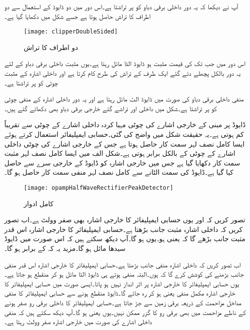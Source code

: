 آپ نے دیکھا کہ یہ دور داخلی برقی دباو کو  پر تراشتا ہے۔اس دور میں دو ڈایوڈ کے استعمال سے دو اطراف کا تراش حاصل ہوتا ہے جسے شکل   میں دکھایا گیا ہے۔
\begin{figure}
\centering
\texttt{[image: clipperDoubleSided]}
\caption{دو اطراف کا تراش}
\label{شکل_دو_اطراف_کا_تراش}
\end{figure}
اس دور میں جب تک  کی قیمت مثبت ہو ڈایوڈ  الٹا مائل رہتا ہے۔یوں مثبت داخلی برقی دباو کے لئے یہ دور بالکل پچھلے دئے گئے ایک طرف کے تراش کی طرح کام کرتا ہے اور داخلی اشارہ کے مثبت چوٹی کو  پر تراشتا ہے۔

منفی داخلی برقی دباو کی صورت میں ڈایوڈ  الٹ مائل رہتا ہے اور یہ دور داخلی اشارہ کے منفی چوٹی کو  پر تراشتا ہے۔شکل میں داخلی اور تراشے گئے خارجی برقی دباو بھی دکھائے گئے ہیں۔

ڈایوڈ پر مبنی  کے خارجی اشارے کی چوٹی مہیا کردہ داخلی اشارے کے چوٹی سے تقریباً  کم ہوتی ہے۔یہ حقیقت شکل  میں واضح کی گئی۔حسابی ایمپلیفائر استعمال کرتے ہوئے ایسا کامل نصف لہر سمت کار حاصل ہوتا ہے  جس کے خارجی اشارے کی چوٹی داخلی اشارے کے چوٹی کے بالکل برابر ہوتی ہے۔شکل الف میں ایسا کامل نصف لہر مثبت سمت کار دکھایا گیا ہے جس میں خارجی اشارہ  کو ڈایوڈ کے خارجی سرے سے حاصل کیا گیا ہے۔ڈایوڈ کی سمت الٹانے سے  کامل نصف لہر منفی سمت کار حاصل ہو گا۔
\begin{figure}
\centering
\texttt{[image: opampHalfWaveRectifierPeakDetector]}
\caption{کامل ادوار}
\label{شکل_کامل_نصف_لہر_سمت_کار}
\end{figure}

تصور کریں کہ  اور یوں حسابی ایمپلیفائر کا خارجی اشارہ  بھی صفر وولٹ ہے۔اب تصور کریں کہ داخلی اشارہ مثبت جانب بڑھتا ہے۔حسابی ایمپلیفائر کا خارجی اشارہ اس قدر مثبت جانب بڑھے گا کہ  یعنی  ہو۔یوں  ہو گا۔آپ دیکھ سکتے ہیں کہ اس صورت میں ڈایوڈ سیدھا مائل ہو گا۔مزید یہ کہ  کے برابر ہو گا۔

اب تصور کریں کہ داخلی اشارہ منفی جانب بڑھتا ہے۔حسابی ایمپلیفائر کا خارجی اشارہ  اس قدر منفی جانب بڑھنے کی کوشش کرے گا کہ  ہوں۔البتہ  منفی ہوتے ہی ڈایوڈ الٹا مائل ہو کر منقطع ہو جاتا ہے۔یوں حسابی ایمپلیفائر کا خارجی اشارہ  پر اثر انداز نہیں ہو پاتا۔ایسی صورت میں حسابی ایمپلیفائر کا خارجی اشارہ مکمل منفی یعنی  ہو کر رہ جائے گا۔ڈایوڈ منقطع ہونے سے  حسابی ایمپلیفائر کا منفی مداخل مزاحمت  کے ذریعہ برقی زمین سے جڑ جاتا ہے۔حسابی ایمپلیفائر کا داخلی برقی رو صفر ہونے کے ناطے مزاحمت میں بھی برقی رو  کا گزر ممکن نہیں۔یوں  یعنی  ہو گا۔آپ دیکھ سکتے ہیں کہ منفی داخلی اشارے کی صورت میں خارجی اشارہ صفر وولٹ رہتا ہے۔

